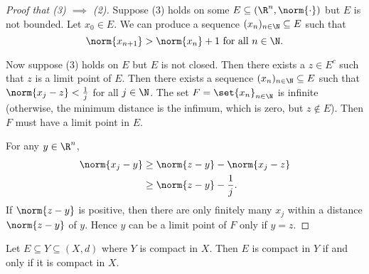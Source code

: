 \begin{proof}[Proof that (3) $\implies$ (2)]
    Suppose (3) holds on some $E \subseteq (\R^n, \norm{\cdot})$ but
    $E$ is not bounded.
    Let $x_0 \in E$.
    We can produce a sequence $(x_n)_{n \in \N} \subseteq E$ such that \[
        \norm{x_{n+1}} > \norm{x_n} + 1 \text{ for all } n \in \N.
    \] %

    Now suppose (3) holds on $E$ but $E$ is not closed.
    Then there exists a $z \in E^c$ such that $z$ is a limit point of $E$.
    Then there exists a sequence $(x_n)_{n \in \N} \subseteq E$ such that
    $\norm{x_j - z} < \frac1j$ for all $j \in \N$.
    The set $F = \set{x_n}_{n \in \N}$ is infinite (otherwise, the minimum
    distance is the infimum, which is zero, but $z \notin E$).
    Then $F$ must have a limit point in $E$.

    For any $y \in \R^n$, \begin{align*}
        \norm{x_j - y} &\ge \norm{z - y} - \norm{x_j - z} \\
                 &\ge \norm{z - y} - \frac1j.
    \end{align*} If $\norm{z - y}$ is positive, then there are only finitely
    many $x_j$ within a distance $\norm{z - y}$ of $y$.
    Hence $y$ can be a limit point of $F$ only if $y = z$.
\end{proof}

\begin{theorem}
    Let $E \subseteq Y \subseteq (X, d)$ where $Y$ is compact in $X$.
    Then $E$ is compact in $Y$ if and only if it is compact in $X$.
\end{theorem}
